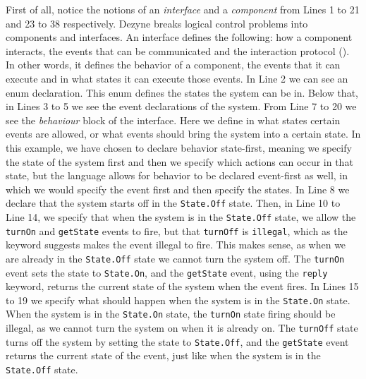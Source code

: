 \documentclass[12pt]{scrreprt}
\begin{document}
\begin{appendices}
First of all, notice the notions of an \textit{interface} and a \textit{component} from Lines 1 to 21 and 23 to 38 respectively. Dezyne breaks logical control problems into components and interfaces. An interface defines the following: how a component interacts, the events that can be communicated and the interaction protocol (\cite{dzndoc}). In other words, it defines the behavior of a component, the events that it can execute and in what states it can execute those events. In Line 2 we can see an enum declaration. This enum defines the states the system can be in. Below that, in Lines 3 to 5 we see the event declarations of the system. %
From Line 7 to 20 we see the \textit{behaviour} block of the interface. Here we define in what states certain events are allowed, or what events should bring the system into a certain state. In this example, we have chosen to declare behavior state-first, meaning we specify the state of the system first and then we specify which actions can occur in that state, but the language allows for behavior to be declared event-first as well, in which we would specify the event first and then specify the states.
In Line 8 we declare that the system starts off in the \texttt{State.Off} state. Then, in Line 10 to Line 14, we specify that when the system is in the \texttt{State.Off} state, we allow the \texttt{turnOn} and \texttt{getState} events to fire, but that \texttt{turnOff} is \texttt{illegal}, which as the keyword suggests makes the event illegal to fire. This makes sense, as when we are already in the \texttt{State.Off} state we cannot turn the system off. The \texttt{turnOn} event sets the state to \texttt{State.On}, and the \texttt{getState} event, using the \texttt{reply} keyword, returns the current state of the system when the event fires. In Lines 15 to 19 we specify what should happen when the system is in the \texttt{State.On} state. When the system is in the \texttt{State.On} state, the \texttt{turnOn} state firing should be illegal, as we cannot turn the system on when it is already on. The \texttt{turnOff} state turns off the system by setting the state to \texttt{State.Off}, and the \texttt{getState} event returns the current state of the event, just like when the system is in the \texttt{State.Off} state.
\\\\

\end{appendices}
\end{document}
